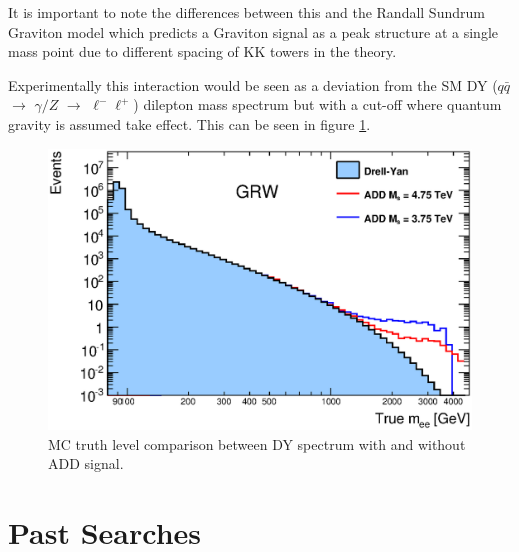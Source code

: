         It is important to note the differences between this and the Randall Sundrum \cite{PhysRevLett.83.3370} Graviton model which predicts a Graviton signal as a peak structure at a single mass point due to different spacing of KK towers in the theory.

        Experimentally this interaction would be seen as a deviation from the SM DY ($q\bar{q}$ $\rightarrow$ $\gamma/Z$ $\rightarrow$ $\ell^{-}\ell^{+}$) dilepton mass spectrum but with a cut-off where quantum gravity is assumed take effect. This can be seen in figure \ref{fig:theoryInvMassADD}.

        \begin{figure}[h]
            \begin{center}
            \includegraphics[width=0.9\linewidth]{images/truth_mass_ADD.eps}
            \end{center}
            \caption{MC truth level comparison between DY spectrum with and without ADD signal.}
            \label{fig:theoryInvMassADD}
        \end{figure}



\section{Past Searches}

